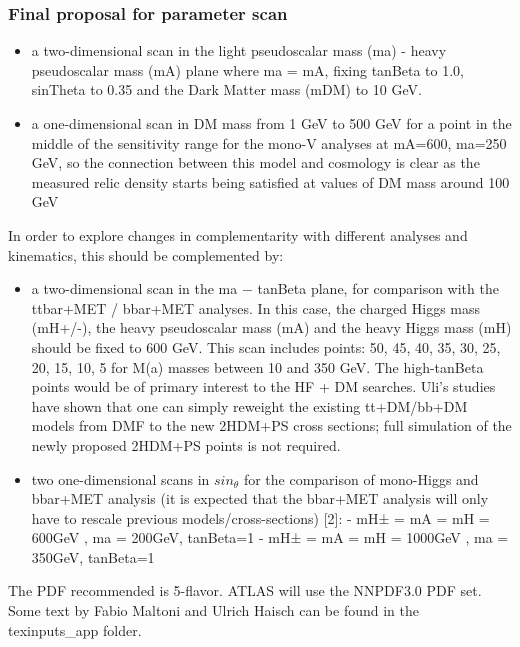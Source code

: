 \subsubsection{Final proposal for parameter scan}

\begin{itemize}

\item a two-dimensional scan in the light pseudoscalar mass (ma) -
heavy pseudoscalar mass (mA) plane where ma = mA, fixing tanBeta to 1.0,
sinTheta to 0.35 and the Dark Matter mass (mDM) to 10 GeV.


\item a one-dimensional scan in DM mass from 1 GeV to 500 GeV for a
point in the middle of the sensitivity range for the mono-V analyses at
mA=600, ma=250 GeV, so the connection between this model and cosmology
is clear as the measured relic density starts being satisfied at values
of DM mass around 100 GeV

\end{itemize}


In order to explore changes in complementarity with different
analyses and kinematics, this should be complemented by:

\begin{itemize}

\item a two-dimensional scan in the ma − tanBeta plane, for
comparison with the ttbar+MET / bbar+MET analyses. In this case, the
charged Higgs mass (mH+/-), the heavy pseudoscalar mass (mA) and the
heavy Higgs mass (mH) should be fixed to 600 GeV. This scan includes points: 
50, 45, 40, 35, 30, 25, 20, 15, 10, 5
for M(a) masses between 10 and 350 GeV. The high-tanBeta points would be
of primary interest to the HF + DM searches. Uli's studies have shown
that one can simply reweight the existing tt+DM/bb+DM models from DMF to
the new 2HDM+PS cross sections; full simulation of the newly proposed
2HDM+PS points is not required.

\item two one-dimensional scans in $sin_{\theta}$ for the comparison of
mono-Higgs and bbar+MET analysis (it is expected that the bbar+MET
analysis will only have to rescale previous models/cross-sections)
{[}2{]}: - mH± = mA = mH = 600GeV , ma = 200GeV, tanBeta=1 - mH± = mA =
mH = 1000GeV , ma = 350GeV, tanBeta=1

\end{itemize}

The PDF recommended is 5-flavor. ATLAS will use the NNPDF3.0
PDF set. Some text by Fabio Maltoni and Ulrich Haisch can be found in the texinputs\_app folder.  

